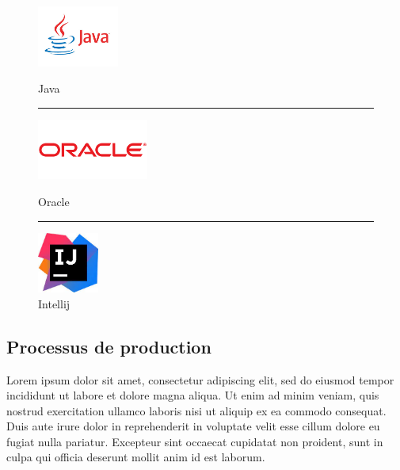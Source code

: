 \documentclass[a4paper, 12pt]{report}
\begin{document}
\begin{figure}
  \begin{center}
    \begin{minipage}{4cm}
      \begin{center}
        \includegraphics[height=2cm]{../res/java.jpg}
        \caption{Java}
      \end{center}
    \end{minipage}
    \rule{1cm}{0cm}
    \begin{minipage}{4cm}
      \begin{center}
        \includegraphics[height=2cm]{../res/oracle.png}
        \caption{Oracle}
      \end{center}
    \end{minipage}
    \rule{1cm}{0cm}
    \begin{minipage}{4cm}
      \begin{center}
        \includegraphics[height=2cm]{../res/intellij.jpg}
        \caption{Intellij}
      \end{center}
    \end{minipage}
  \end{center}
\end{figure}

\subsection{Processus de production}

Lorem ipsum dolor sit amet, consectetur adipiscing elit, sed do eiusmod tempor incididunt ut labore et dolore magna aliqua. Ut enim ad minim veniam, quis nostrud exercitation ullamco laboris nisi ut aliquip ex ea commodo consequat. Duis aute irure dolor in reprehenderit in voluptate velit esse cillum dolore eu fugiat nulla pariatur. Excepteur sint occaecat cupidatat non proident, sunt in culpa qui officia deserunt mollit anim id est laborum.
\end{document}
